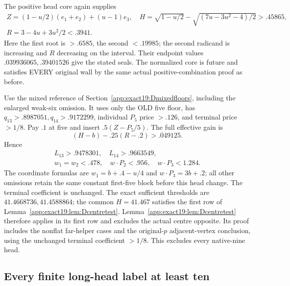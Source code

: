 \documentclass[11pt]{article}
\theoremstyle{definition}
\theoremstyle{remark}
\begin{document}
The positive head core again supplies
\[
\begin{gathered}
 Z=(1-u/2)(e_1+e_2)+(u-1)e_3,\quad
 H=\sqrt{1-u/2}-\sqrt{(7u-3u^2-4)/2}>.45865,\\
 R=3-4u+3u^2/2<.3941 .
\end{gathered}
\]
Here the first root is \(>.6585\), the second \(<.19985\);
the second radicand is increasing and \(R\) decreasing on the interval.
Their endpoint values \(.039936065,.39401526\) give the stated seals.
The normalized core is future and satisfies EVERY original wall by
the same actual positive-combination proof as before.

Use the mixed reference of
Section~\ref{app:exact19:Dmixedfloors}, including the enlarged weak-six
omission. It uses only the OLD five floor, has
\(q_{13}>.8987051,q_{14}>.9172299\), individual \(P_5\) price \(>.126\),
and terminal price \(>1/8\).
Pay \(.1\) at five and insert \(.5(Z-P_5/5)\).
The full effective gain is
\[
                  (H-b)-.25(R-.2)>.049125 .
\]
Hence
\[
\begin{gathered}
 L_{13}>.9478301,\quad L_{14}>.9663549,\\
 w_1=w_2<.478,\quad w\cdot P_2<.956,\quad w\cdot P_3<1.284 .
\end{gathered}
\]
The coordinate formulas are \(w_1=b+.4-u/4\) and
\(w\cdot P_3=3b+.2\); all other omissions retain the same constant
first-five block before this head change.
The terminal coefficient is unchanged.
The exact sufficient thresholds are \(41.4668736,41.4588864\);
the common \(H=41.467\) satisfies the first row of
Lemma~\ref{app:exact19:lem:Dcentretest}.
Lemma~\ref{app:exact19:lem:Dcentretest} therefore applies in its first row
and excludes the actual centre opposite. Its proof includes the nonflat
far-helper cases and the original-$p$ adjacent-vertex conclusion, using
the unchanged terminal coefficient $>1/8$.
This excludes every native-nine head.

\subsection{Every finite long-head label at least ten}
\label{app:exact19:Dlargefinite}
\end{document}
